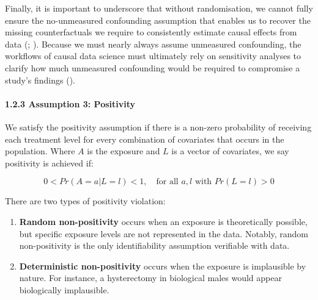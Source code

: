 \documentclass[
  singlecolumn]{article}
\let\oldparagraph\paragraph
\renewcommand{\paragraph}[1]{\oldparagraph{#1}\mbox{}}
\begin{document}
Finally, it is important to underscore that without randomisation, we
cannot fully ensure the no-unmeasured confounding assumption that
enables us to recover the missing counterfactuals we require to
consistently estimate causal effects from data
(;
). Because we must
nearly always assume unmeasured confounding, the workflows of causal
data science must ultimately rely on sensitivity analyses to clarify how
much unmeasured confounding would be required to compromise a study's
findings ().

\paragraph{1.2.3 Assumption 3:
Positivity}\label{assumption-3-positivity}

We satisfy the positivity assumption if there is a non-zero probability
of receiving each treatment level for every combination of covariates
that occurs in the population. Where \(A\) is the exposure and \(L\) is
a vector of covariates, we say positivity is achieved if:

\[
0 < Pr(A = a | L = l) < 1, \quad \text{for all } a, l \text{ with } Pr(L = l) > 0
\]

There are two types of positivity violation:

\begin{enumerate}
\def\labelenumi{\arabic{enumi}.}
\item
  \textbf{Random non-positivity} occurs when an exposure is
  theoretically possible, but specific exposure levels are not
  represented in the data. Notably, random non-positivity is the only
  identifiability assumption verifiable with data.
\item
  \textbf{Deterministic non-positivity} occurs when the exposure is
  implausible by nature. For instance, a hysterectomy in biological
  males would appear biologically implausible.
\end{enumerate}
\end{document}
